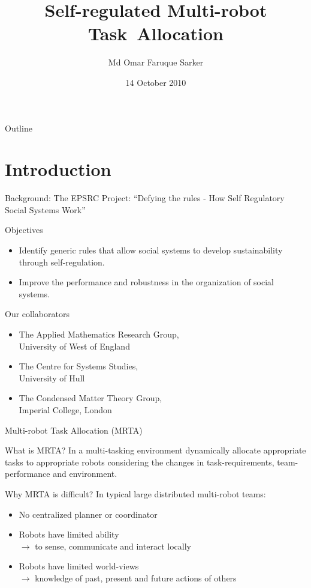 \documentclass{beamer}
\title[Self-regulated Multi-robot Task~Allocation] 
{%
  Self-regulated Multi-robot Task~Allocation%
}
\author[MOFSarker]
{
  Md Omar Faruque Sarker
}
\institute[UWN]
{
 PhD Student\\
 Cognitive Robotics Research Centre\\
 Newport Business School\\
 University of Wales, Newport
}
\date{14 October 2010}
\begin{document}
\begin{frame}
  \titlepage
\end{frame}

\begin{frame}{Outline}
  \tableofcontents
\end{frame}
\section{Introduction}
\begin{frame}[t]{Background: The EPSRC Project: ``Defying the rules - How Self Regulatory Social Systems Work''}
\begin{block}{Objectives}
\begin{itemize}
\item \alert{Identify generic rules} that allow social systems to develop sustainability through \alert{self-regulation}.
\item Improve the \alert{performance} and \alert{robustness} in the organization of social systems. 
\end{itemize}
\end{block}
\begin{block}{Our collaborators}
\begin{itemize}
\item The Applied Mathematics Research Group,\\ \alert{University of West of England}
\item The Centre for Systems Studies,\\ \alert{University of Hull}
\item The Condensed Matter Theory Group,\\ \alert{ Imperial College, London}
\end{itemize}
\end{block}
\end{frame}
\begin{frame}[t]{Multi-robot Task Allocation (MRTA)}
	
\begin{block}{What is MRTA?}
In a multi-tasking environment \alert{dynamically allocate appropriate tasks to appropriate robots} considering the  changes in task-requirements, team-performance and environment.
\end{block}
  	
\begin{block}{Why MRTA is difficult?}
In typical large distributed multi-robot teams:
\begin{itemize}
\item No centralized planner or coordinator
\item \alert{Robots have limited ability}\\
$\rightarrow$ \small to sense, communicate and interact locally
\item \normalsize \alert{Robots have limited world-views}\\ 
$\rightarrow$ \small knowledge of past, present and future actions of others
\end{itemize}
\end{block}
  	
\end{frame}
\end{document}
